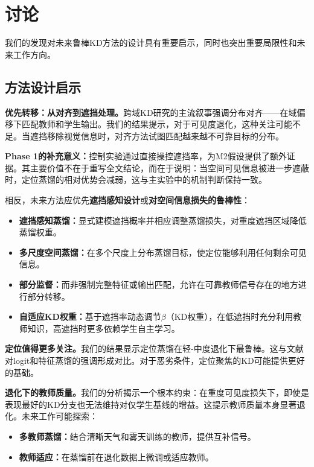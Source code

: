 \section{讨论}
\label{sec:discussion}

我们的发现对未来鲁棒KD方法的设计具有重要启示，同时也突出重要局限性和未来工作方向。

\subsection{方法设计启示}

\textbf{优先转移：从对齐到遮挡处理。}跨域KD研究的主流叙事强调分布对齐——在域偏移下匹配教师和学生输出。我们的结果提示，对于可见度退化，这种关注可能不足。当遮挡移除视觉信息时，对齐方法试图匹配越来越不可靠目标的分布。

\textbf{Phase 1的补充意义：}控制实验通过直接操控遮挡率，为M2假设提供了额外证据。其主要价值不在于重写全文结论，而在于说明：当空间可见信息被进一步遮蔽时，定位蒸馏的相对优势会减弱，这与主实验中的机制判断保持一致。

相反，未来方法应优先\textbf{遮挡感知设计}或\textbf{对空间信息损失的鲁棒性}：
\begin{itemize}
    \item \textbf{遮挡感知蒸馏：}显式建模遮挡概率并相应调整蒸馏损失，对重度遮挡区域降低蒸馏权重。
    \item \textbf{多尺度空间蒸馏：}在多个尺度上分布蒸馏目标，使定位能够利用任何剩余可见信息。
    \item \textbf{部分监督：}而非强制完整特征或输出匹配，允许在可靠教师信号存在的地方进行部分转移。
    \item \textbf{自适应KD权重：}基于遮挡率动态调节$\beta$（KD权重），在低遮挡时充分利用教师知识，高遮挡时更多依赖学生自主学习。
\end{itemize}

\textbf{定位值得更多关注。}我们的结果显示定位蒸馏在轻-中度退化下最鲁棒。这与文献对logit和特征蒸馏的强调形成对比。对于恶劣条件，定位聚焦的KD可能提供更好的基础。

\textbf{退化下的教师质量。}我们的分析揭示一个根本约束：在重度可见度损失下，即使是表现最好的KD分支也无法维持对仅学生基线的增益。这提示教师质量本身显著退化。未来工作可能探索：
\begin{itemize}
    \item \textbf{多教师蒸馏：}结合清晰天气和雾天训练的教师，提供互补信号。
    \item \textbf{教师适应：}在蒸馏前在退化数据上微调或适应教师。
\end{itemize}

